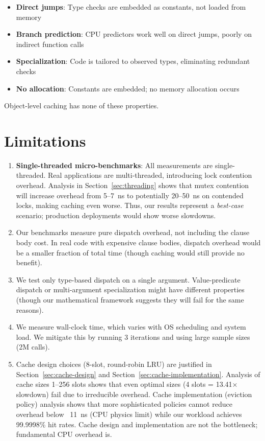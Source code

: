 \documentclass[sigplan,final]{acmart}
\begin{document}
\begin{itemize}
  \item \textbf{Direct jumps}: Type checks are embedded as constants, not loaded from memory
  \item \textbf{Branch prediction}: CPU predictors work well on direct jumps, poorly on indirect
    function calls
  \item \textbf{Specialization}: Code is tailored to observed types, eliminating redundant checks
  \item \textbf{No allocation}: Constants are embedded; no memory allocation occurs
\end{itemize}

Object-level caching has none of these properties.

\section{Limitations}

\begin{enumerate}
  \item \textbf{Single-threaded micro-benchmarks}: All measurements are single-threaded. Real
    applications are multi-threaded, introducing lock contention overhead. Analysis in
    Section~\ref{sec:threading} shows that mutex contention will increase overhead from 5--7~ns
    to potentially 20--50~ns on contended locks, making caching even worse. Thus, our results
    represent a \emph{best-case} scenario; production deployments would show worse slowdowns.

  \item Our benchmarks measure pure dispatch overhead, not including the clause body cost. In real
    code with expensive clause bodies, dispatch overhead would be a smaller fraction of total time
    (though caching would still provide no benefit).

  \item We test only type-based dispatch on a single argument. Value-predicate dispatch or
    multi-argument specialization might have different properties (though our mathematical framework
    suggests they will fail for the same reasons).

  \item We measure wall-clock time, which varies with OS scheduling and system load. We mitigate
    this by running 3 iterations and using large sample sizes (2M calls).

  \item Cache design choices (8-slot, round-robin LRU) are justified in Section~\ref{sec:cache-design}
    and Section~\ref{sec:cache-implementation}. Analysis of cache sizes 1--256 slots shows that
    even optimal sizes (4 slots = 13.41× slowdown) fail due to irreducible overhead. Cache
    implementation (eviction policy) analysis shows that more sophisticated policies cannot reduce
    overhead below ~11~ns (CPU physics limit) while our workload achieves 99.9998\% hit rates.
    Cache design and implementation are not the bottleneck; fundamental CPU overhead is.
\end{enumerate}
\end{document}
